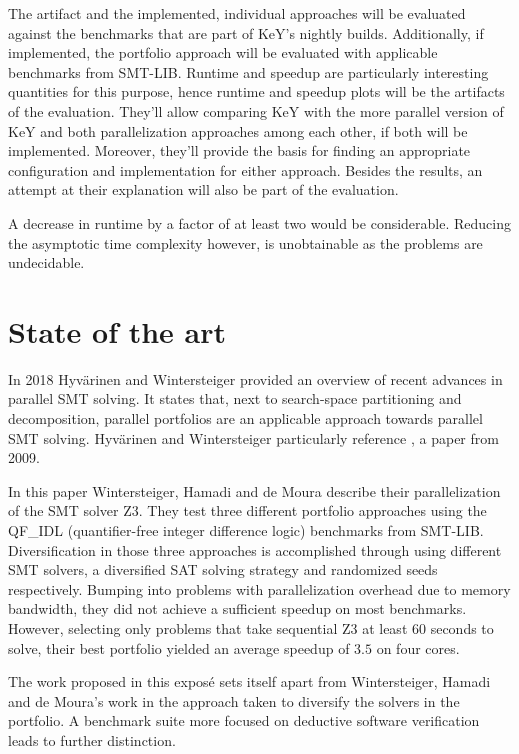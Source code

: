 \documentclass{scrartcl}
\begin{document}
The artifact and the implemented, individual approaches will be evaluated
against the benchmarks that are part of KeY's nightly builds.
Additionally, if implemented,
the portfolio approach will be evaluated with applicable benchmarks from SMT-LIB.
Runtime and speedup are particularly interesting quantities for this purpose,
hence runtime and speedup plots will be the artifacts of the evaluation.
They'll allow comparing KeY with the more parallel version of KeY and
both parallelization approaches among each other, if both will be implemented.
Moreover, they'll provide the basis for finding an appropriate configuration
and implementation for either approach.
Besides the results, an attempt at their explanation will also be part of the evaluation.

A decrease in runtime by a factor of at least two would be considerable.
Reducing the asymptotic time complexity however, is unobtainable
as the problems are undecidable.

\section{State of the art}
In 2018 Hyvärinen and Wintersteiger \cite{HJW2018} provided an overview of
recent advances in parallel SMT solving.
It states that, next to search-space partitioning and decomposition,
parallel portfolios are an applicable approach towards parallel SMT solving.
Hyvärinen and Wintersteiger particularly reference \cite{WHM2009}, a paper from 2009.

In this paper Wintersteiger, Hamadi and de Moura describe their parallelization of the
SMT solver Z3.
They test three different portfolio approaches using the QF\_IDL
(quantifier-free integer difference logic) benchmarks from SMT-LIB.
Diversification in those three approaches is accomplished through using
different SMT solvers, a diversified SAT solving strategy
and randomized seeds respectively.
Bumping into problems with parallelization overhead due to memory bandwidth,
they did not achieve a sufficient speedup on most benchmarks.
However, selecting only problems that take sequential Z3 at least 60 seconds to solve,
their best portfolio yielded an average speedup of \(3.5\) on four cores.

The work proposed in this exposé sets itself apart from Wintersteiger, Hamadi and de Moura's work
in the approach taken to diversify the solvers in the portfolio.
A benchmark suite more focused on deductive software verification leads to further distinction.
\end{document}
